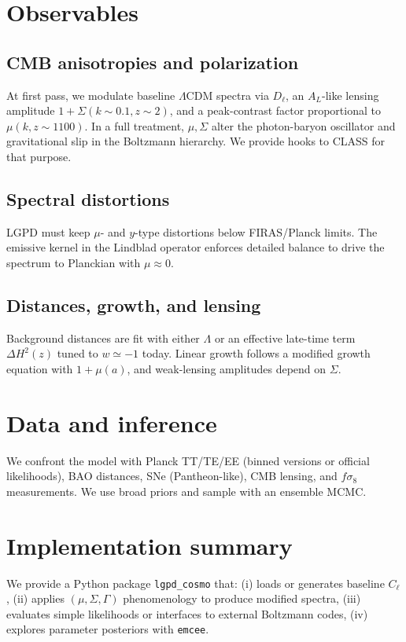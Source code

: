 \documentclass[11pt]{article}
\begin{document}
\section{Observables}
\subsection{CMB anisotropies and polarization}
At first pass, we modulate baseline $\Lambda$CDM spectra via $D_\ell$, an $A_L$-like lensing amplitude $1+\Sigma(k\!\sim\!0.1,z\!\sim\!2)$, and a peak-contrast factor proportional to $\mu(k,z\!\sim\!1100)$.
In a full treatment, $\mu,\Sigma$ alter the photon-baryon oscillator and gravitational slip in the Boltzmann hierarchy. We provide hooks to CLASS for that purpose.

\subsection{Spectral distortions}
LGPD must keep $\mu$- and $y$-type distortions below FIRAS/Planck limits. The emissive kernel in the Lindblad operator enforces detailed balance to drive the spectrum to Planckian with $\mu\!\approx\!0$.

\subsection{Distances, growth, and lensing}
Background distances are fit with either $\Lambda$ or an effective late-time term $\Delta H^2(z)$ tuned to $w\simeq -1$ today.
Linear growth follows a modified growth equation with $1+\mu(a)$, and weak-lensing amplitudes depend on $\Sigma$.

\section{Data and inference}
We confront the model with Planck TT/TE/EE (binned versions or official likelihoods), BAO distances, SNe (Pantheon-like), CMB lensing, and $f\sigma_8$ measurements. We use broad priors and sample with an ensemble MCMC.

\section{Implementation summary}
We provide a Python package \texttt{lgpd\_cosmo} that:
(i) loads or generates baseline $C_\ell$,
(ii) applies $(\mu,\Sigma,\Gamma)$ phenomenology to produce modified spectra,
(iii) evaluates simple likelihoods or interfaces to external Boltzmann codes,
(iv) explores parameter posteriors with \texttt{emcee}.
\end{document}
